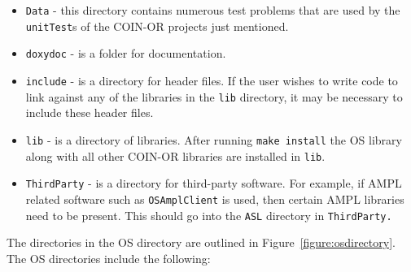 \documentclass[11pt]{article}
\newcounter{Fig}
\renewcommand{\_}{{\char"5F}}
\renewcommand{\{}{{\char"7B}}
\renewcommand{\}}{{\char"7D}}
\renewcommand{\^}{{\char"0D}}
\renewcommand{\'}{{\char"0D}}
\begin{document}
\begin{enumerate}[Step 1:]
\begin{itemize}
\item {\tt Data} - this directory contains numerous test problems that are used by the {\tt unitTest}s of
the COIN-OR projects just mentioned.

\item {\tt doxydoc} - is a folder for documentation.

\item {\tt include} - is a directory for header files. If the user wishes to write code to link against any of the libraries in the {\tt lib} directory, it may be necessary to include these header files.

\item {\tt lib} - is a directory of libraries. After running {\tt make install} the OS library along with all other COIN-OR libraries are installed in {\tt lib}.

\item {\tt ThirdParty} - is a  directory for third-party software. For example, if AMPL related software
such as {\tt OSAmplClient} is used, then certain AMPL libraries need to be present.
This should go into the {\tt ASL} directory in {\tt ThirdParty.}
\end{itemize}


The directories in the OS directory are outlined in Figure~\ref{figure:osdirectory}.  The OS directories include the following:



\end{enumerate}
\end{document}
